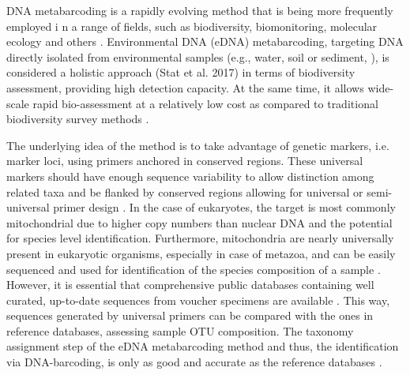    DNA metabarcoding is a rapidly evolving method that is being more frequently employed i
   n a range of fields, such as biodiversity, biomonitoring, molecular ecology and others 
   \citep{deiner2017environmental, ruppert2019past}. 
   Environmental DNA (eDNA) metabarcoding, targeting DNA directly isolated from environmental samples
   (e.g., water, soil or sediment, \citep{taberlet2012environmental}), is considered a holistic approach 
   (Stat et al. 2017) in terms of biodiversity assessment, providing high detection capacity. 
   At the same time, it allows wide-scale rapid bio-assessment \citep{stat2017ecosystem} at a relatively
   low cost as compared to traditional biodiversity survey methods \citep{ji2013reliable}.

   The underlying idea of the method is to take advantage of genetic markers, i.e. marker loci, 
   using primers anchored in conserved regions. 
   These universal markers should have enough sequence variability to allow distinction among 
   related taxa and be flanked by conserved regions allowing for universal or semi-universal primer design \citep{deagle2014dna}. 
   In the case of eukaryotes, the target is most commonly mitochondrial due to higher copy numbers than nuclear DNA and the potential for species level identification. 
   Furthermore, mitochondria are nearly universally present in eukaryotic organisms, especially in case of metazoa, and can be easily sequenced and used for identification of the species composition of a sample \citep{taberlet2012towards}. 
   However, it is essential that comprehensive public databases containing well curated, up-to-date sequences from voucher specimens are available \citep{schenekar2020reference}. 
   This way, sequences generated by universal primers can be compared with the ones in reference databases, assessing sample OTU composition. 
   The taxonomy assignment step of the eDNA metabarcoding method and thus, the identification via DNA-barcoding, is only as good and accurate as the reference databases \citep{cilleros2019unlocking}. 


